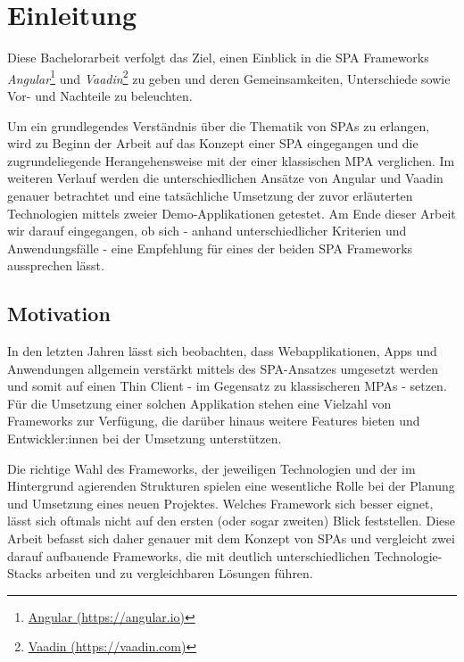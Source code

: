 \documentclass[a4paper,12pt,twoside]{scrreprt}
\begin{document}
\chapter{Einleitung}
\label{chap:einleitung}
Diese Bachelorarbeit verfolgt das Ziel, einen Einblick in die \ac{SPA} Frameworks \textit{Angular}\footnote{\href{https://angular.io/}{Angular (https://angular.io)}} und \textit{Vaadin}\footnote{\href{https://vaadin.com/}{Vaadin (https://vaadin.com)}} zu geben und deren Gemeinsamkeiten, Unterschiede sowie Vor- und Nachteile zu beleuchten.

\medskip

Um ein grundlegendes Verständnis über die Thematik von \aclp{SPA} zu erlangen, wird zu Beginn der Arbeit auf das Konzept einer \ac{SPA} eingegangen und die zugrundeliegende Herangehensweise mit der einer klassischen \ac{MPA} verglichen. Im weiteren Verlauf werden die unterschiedlichen Ansätze von Angular und Vaadin genauer betrachtet und eine tatsächliche Umsetzung der zuvor erläuterten Technologien mittels zweier Demo-Applikationen getestet. Am Ende dieser Arbeit wir darauf eingegangen, ob sich - anhand unterschiedlicher Kriterien und Anwendungsfälle - eine Empfehlung für eines der beiden \acs{SPA} Frameworks aussprechen lässt.

\section{Motivation}
\label{sec:motivation}
In den letzten Jahren lässt sich beobachten, dass Webapplikationen, Apps und Anwendungen allgemein verstärkt mittels des \acs{SPA}-Ansatzes umgesetzt werden und somit auf einen Thin Client - im Gegensatz zu klassischeren \aclp{MPA} - setzen. Für die Umsetzung einer solchen Applikation stehen eine Vielzahl von Frameworks zur Verfügung, die darüber hinaus weitere Features bieten und Entwickler:innen bei der Umsetzung unterstützen.

\newpage

Die richtige Wahl des Frameworks, der jeweiligen Technologien und der im Hintergrund agierenden Strukturen spielen eine wesentliche Rolle bei der Planung und Umsetzung eines neuen Projektes. Welches Framework sich besser eignet, lässt sich oftmals nicht auf den ersten (oder sogar zweiten) Blick feststellen. Diese Arbeit befasst sich daher genauer mit dem Konzept von \aclp{SPA} und vergleicht zwei darauf aufbauende Frameworks, die mit deutlich unterschiedlichen Technologie-Stacks arbeiten und zu vergleichbaren Lösungen führen.
\end{document}
